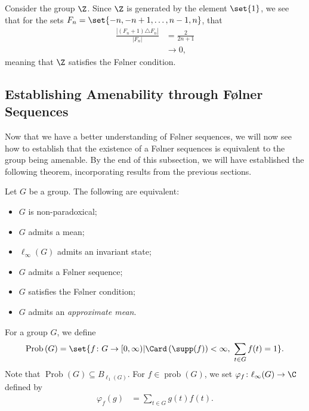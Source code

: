 \documentclass[10pt]{mypackage2}
\begin{document}
\begin{example}
  Consider the group $\Z$. Since $\Z$ is generated by the element $\set{1}$, we see that for the sets $F_n = \set{-n,-n+1,\dots,n-1,n}$, that
  \begin{align*}
    \frac{\left\vert \left(F_n + 1\right)\triangle F_n \right\vert}{\left\vert F_n \right\vert} &= \frac{2}{2n+1}\\
                                                                                                &\rightarrow 0,
  \end{align*}
  meaning that $\Z$ satisfies the Følner condition.
\end{example}
\subsection{Establishing Amenability through Følner Sequences}%
Now that we have a better understanding of Følner sequences, we will now see how to establish that the existence of a Følner sequences is equivalent to the group being amenable. By the end of this subsection, we will have established the following theorem, incorporating results from the previous sections.
\begin{theorem}\label{thm:five_amenability_conditions}
  Let $G$ be a group. The following are equivalent:
  \begin{itemize}
    \item $G$ is non-paradoxical;
    \item $G$ admits a mean;
    \item $\ell_{\infty}(G)$ admits an invariant state;
    \item $G$ admits a Følner sequence;
    \item $G$ satisfies the Følner condition;
    \item $G$ admits an \textit{approximate mean}.
  \end{itemize}
\end{theorem}
\begin{definition}\label{def:state_on_prob_g}
  For a group $G$, we define
  \begin{align*}
    \operatorname{Prob}\left(G\right) = \set{f\colon G\rightarrow [0,\infty) | \Card\left(\supp(f)\right)  < \infty,~\sum_{t\in G}f(t) = 1}.
  \end{align*}
  Note that $\operatorname{Prob}(G) \subseteq B_{\ell_1\left(G\right)}$. For $f\in \operatorname{prob}(G)$, we set $\varphi_f\colon \ell_{\infty}(G)\rightarrow \C$ defined by
  \begin{align*}
    \varphi_f\left(g\right) &= \sum_{t\in G}g(t)f(t).
  \end{align*}
\end{definition}
\end{document}
